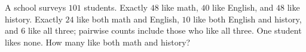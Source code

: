 A school surveys $101$ students. Exactly $48$ like math, $40$ like English, and $48$ like history. Exactly $24$ like both math and English, $10$ like both English and history, and $6$ like all three; pairwise counts include those who like all three. One student likes none. How many like both math and history?
